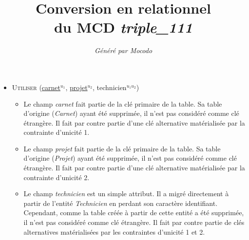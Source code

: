 \documentclass[a4paper]{article}
\title{Conversion en relationnel\\du MCD \emph{triple_111}}
\author{\emph{Généré par Mocodo}}
\newcommand{\relat}[1]{\textsc{#1}}
\newcommand{\attr}[1]{#1}
\newcommand{\prim}[1]{\uline{#1}}
\begin{document}
\maketitle

\begin{itemize}
  \item \relat{Utiliser} (\prim{carnet}$^{u_1}$, \prim{projet}$^{u_2}$, \attr{technicien}$^{u_1 u_2}$)
  \begin{itemize}
    \item Le champ \emph{carnet} fait partie de la clé primaire de la table. Sa table d'origine (\emph{Carnet}) ayant été supprimée, il n'est pas considéré comme clé étrangère. Il fait par contre partie d'une clé alternative matérialisée par la contrainte d'unicité 1.
    \item Le champ \emph{projet} fait partie de la clé primaire de la table. Sa table d'origine (\emph{Projet}) ayant été supprimée, il n'est pas considéré comme clé étrangère. Il fait par contre partie d'une clé alternative matérialisée par la contrainte d'unicité 2.
    \item Le champ \emph{technicien} est un simple attribut. Il a migré directement à partir de l'entité \emph{Technicien} en perdant son caractère identifiant. Cependant, comme la table créée à partir de cette entité a été supprimée, il n'est pas considéré comme clé étrangère. Il fait par contre partie de clés alternatives matérialisées par les contraintes d'unicité 1 et 2.
  \end{itemize}

\end{itemize}
\end{document}
